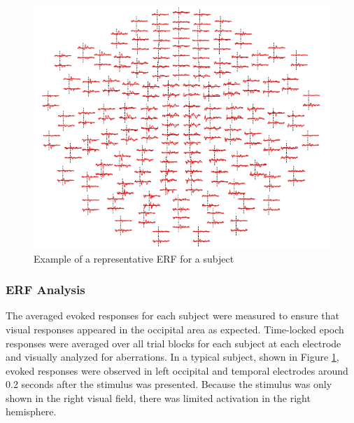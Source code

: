 \documentclass[../main.tex]{subfiles}
\begin{document}
\begin{figure}
    \centering
    \includegraphics[scale=0.6]{figures/methods/good_topomap.PNG}
    \caption{Example of a representative ERF for a subject}
    \label{good_topomap}
\end{figure}

\subsubsection*{ERF Analysis}
The averaged evoked responses for each subject were measured to ensure that visual responses
appeared in the occipital area as expected. Time-locked epoch responses were averaged over all
trial blocks for each subject at each electrode and visually analyzed for aberrations. In a typical subject, shown in Figure \ref{good_topomap}, evoked responses were observed in left occipital and temporal electrodes around 0.2 seconds after the stimulus was presented. Because the stimulus was only shown in the right visual field, there was limited activation in the right hemisphere.
\end{document}
